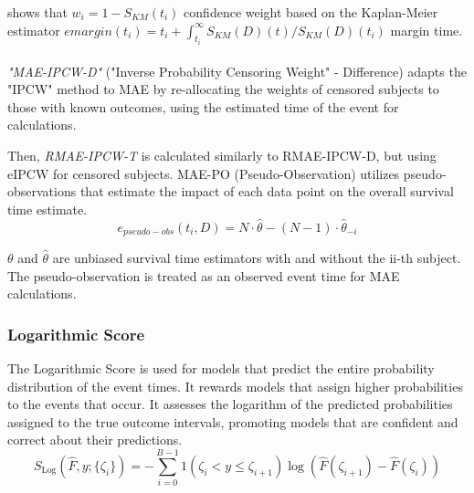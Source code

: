 \noindent \parencite{qi_effective_2023} shows that \(w_{i} = 1-S_{KM}(t_{i})\) confidence weight based on the Kaplan-Meier estimator \(emargin(t_{i})=t_{i}+\int_{t_{i}}^{\infty} S_{KM}(D)(t)/S_{KM}(D)(t_{i})\) margin time.
\\\\
\noindent \textit{"MAE-IPCW-D"} ("Inverse Probability Censoring Weight" - Difference) adapts the "IPCW" method to MAE by re-allocating the weights of censored subjects to those with known outcomes, using the estimated time of the event for calculations.
\par \noindent Then, \textit{RMAE-IPCW-T} is calculated similarly to RMAE-IPCW-D, but using eIPCW  for censored subjects. MAE-PO (Pseudo-Observation) utilizes pseudo-observations that estimate the impact of each data point on the overall survival time estimate. 
\begin{equation} \label{eq:maepsuedo}e_{pseudo-obs}(t_i, D) = N \cdot \hat{\theta} - (N - 1) \cdot \hat{\theta}_{-i}\end{equation}
\par \noindent \(\theta\) and \(\hat{\theta}\) are unbiased survival time estimators with and without the ii-th subject. The pseudo-observation is treated as an observed event time for MAE calculations.


\subsubsection*{Logarithmic Score}
The Logarithmic Score \parencite{yanagisawa_proper_2023} is used for models that predict the entire probability distribution of the event times. It rewards models that assign higher probabilities to the events that occur. It assesses the logarithm of the predicted probabilities assigned to the true outcome intervals, promoting models that are confident and correct about their predictions.
\begin{equation} \label{eq:logscore}S_{\text{Log}}(\hat{F}, y; \{\zeta_i\}) = -\sum_{i=0}^{B-1} 1(\zeta_i < y \leq \zeta_{i+1}) \log(\hat{F}(\zeta_{i+1}) - \hat{F}(\zeta_i))\end{equation}

